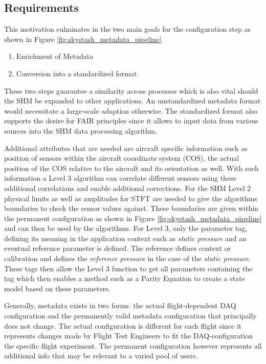 \subsection{Requirements}

This motivation culminates in the two main goals for the configuration step as shown in Figure \ref{fig:skystash_metadata_pipeline}.
\begin{enumerate}
    \item Enrichment of Metadata
    \item Conversion into a standardized format
\end{enumerate}
These two steps guarantee a similarity across processes which is also vital should the SHM be expanded to other applications. An unstandardized metadata format would necessitate a large-scale adaption otherwise. The standardized format also supports the desire for FAIR principles since it allows to input data from various sources into the SHM data processing algorithm.

Additional attributes that are needed are aircraft specific information such as position of sensors within the aircraft coordinate system (COS), the actual position of the COS relative to the aircraft and its orientation as well. With such information a Level 3 algorithm can correlate different sensors using these additional correlations and enable additional corrections. For the SHM Level 2 physical limits as well as amplitudes for STFT are needed to give the algorithms boundaries to check the sensor values against. These boundaries are given within the permanent configuration as shown in Figure \ref{fig:skystash_metadata_pipeline} and can then be used by the algorithms. For Level 3, only the parameter tag, defining its meaning in the application context such as \textit{static pressure} and an eventual reference parameter is defined. The reference defines context or calibration and defines the \textit{reference pressure} in the case of the \textit{static pressure}. These tags then allow the Level 3 function to get all parameters containing the tag which then enables a method such as a Parity Equation to create a state model based on these parameters.

Generally, metadata exists in two forms. the actual flight-dependent DAQ configuration and the permanently valid metadata configuration that principally does not change. The actual configuration is different for each flight since it represents changes made by Flight Test Engineers to fit the DAQ-configuration the specific flight experiment. The permanent configuration however represents all additional info that may be relevant to a varied pool of users.


